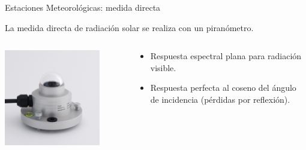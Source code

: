 \documentclass[xcolor={usenames,svgnames,dvipsnames}]{beamer}
\begin{document}
\begin{frame}[label={sec:org250eedd}]{Estaciones Meteorológicas: medida directa}
\begin{block}{La medida directa de radiación solar se realiza con un piranómetro.}
\end{block}
\begin{columns}
\begin{column}{0.4\columnwidth}
\begin{center}
\begin{center}
\includegraphics[width=0.8\textwidth]{../figs/piranometro.jpg}
\end{center}
\end{center}
\end{column}
\begin{column}{0.6\columnwidth}
\begin{itemize}
\item Respuesta espectral plana para radiación visible.
\item Respuesta perfecta al coseno del ángulo de incidencia (pérdidas por reflexión).
\end{itemize}
\end{column}
\end{columns}
\end{frame}
\end{document}
